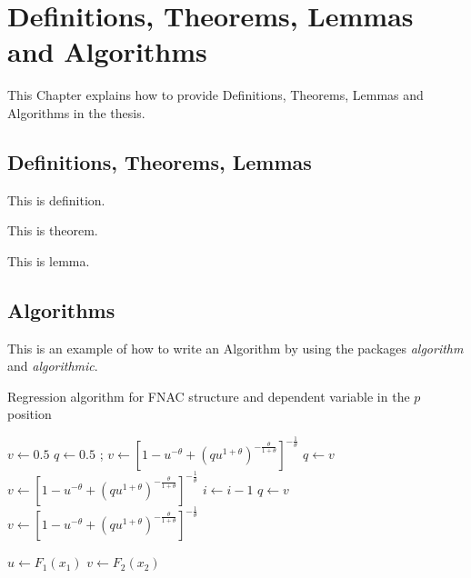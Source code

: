 \chapter{Definitions, Theorems, Lemmas and Algorithms}

This Chapter explains how to provide Definitions, Theorems, Lemmas and Algorithms in the thesis.

\section{Definitions, Theorems, Lemmas}

\begin{definition}
		This is definition.
\end{definition}

\begin{theorem}
		This is theorem. 
\end{theorem}

\begin{lemma}
		This is lemma. 
\end{lemma}

\section{Algorithms}

This is an example of how to write an Algorithm by using the packages \textit{algorithm} and \textit{algorithmic}.

\begin{algorithm} 
\caption{Regression algorithm for FNAC structure and dependent variable in the $p$ position}
\label{alg_2}
	\begin{algorithmic}[1]
		\State $v\gets 0.5$ 
		\State $q\gets 0.5$ 
				;
				\State $v\gets [1-u^{-\theta}+(qu^{1+\theta})^{-\frac{\theta}{1+\theta}}]^{-\frac{1}{\theta}}$ 
		\Else
    		 
				\State $q\gets v$ 
				\State $v\gets [1-u^{-\theta}+(qu^{1+\theta})^{-\frac{\theta}{1+\theta}}]^{-\frac{1}{\theta}}$  
				\State $i\gets i-1$ 
			\EndFor {}
			\State $q\gets v$ 
			\State $v\gets [1-u^{-\theta}+(qu^{1+\theta})^{-\frac{\theta}{1+\theta}}]^{-\frac{1}{\theta}}$  
\EndIf

\State $u\gets F_1(x_1)$ 
\State $v\gets F_2(x_2)$ 
		
	\end{algorithmic}
	\end{algorithm}